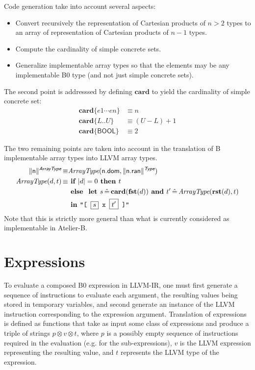 \documentclass{article}
\newcommand{\trad}[2]{\ensuremath{\lVert \textsf{#1} \rVert^{\textit{#2}}}}
\DeclareMathOperator{\isdef}{\equiv}
\newcommand{\llvm}[1]{\texttt{#1}}
\newcommand{\B}[1]{\textsf{#1}}
\newcommand{\IF}[0]{\textbf{ if }}
\newcommand{\ELSE}[0]{\textbf{ else }}
\newcommand{\THEN}[0]{\textbf{ then }}
\newcommand{\LET}[0]{\textbf{ let }}
\DeclareMathOperator{\BE}{\hat{=}}
\newcommand{\IN}[0]{\textbf{ in }}
\newcommand{\AND}[0]{\textbf{ and }}
\newcommand{\PH}[1]{\framebox{$#1$}}
\newcommand{\sep}[0]{\otimes}
\begin{document}
Code generation take into account several aspects:
\begin{itemize}
\item Convert recursively the representation of Cartesian products of
  $n>2$ types to an array of representation of Cartesian products of
  $n-1$ types.
\item Compute the cardinality of simple concrete sets.
\item Generalize implementable array types so that the elements may be
  any implementable B0 type (and not just simple concrete sets).
\end{itemize}

\newcommand{\card}[0]{\mathbf{card}}
\newcommand{\twodots}[0]{..}

The second point is addresssed by defining $\card$ to yield the
cardinality of simple concrete set:
\begin{align*}
  \card \{ e1 \cdots en \} &\isdef n \\
  \card \{ L \twodots U \} &\isdef (U - L) + 1 \\
  \card \{ \B{BOOL} \} &\isdef 2
\end{align*}

The two remaining points are taken into account in the translation of
B implementable array types into LLVM array types.
\begin{align*}
  \trad{n}{\B{ArrayType}} \isdef & \textit{ArrayType}(\B{n.dom}, \trad{n.ran}{\B{Type}}) \\
  \textit{ArrayType}(d, t) \isdef & \IF |d| = 0 \THEN t \\
  & \ELSE \LET s \BE \card(\fst(d)) \AND t' \BE \textit{ArrayType}(\rst(d), t) \\
  & \IN \llvm{"[ \PH{s} x \PH{t'} ]"}
\end{align*}
Note that this is strictly more general than what is currently
considered as implementable in Atelier-B.

\section{Expressions}
\label{sec:expr}

To evaluate a composed B0 expression in LLVM-IR, one must first
generate a sequence of instructions to evaluate each argument, the
resulting values being stored in temporary variables, and second
generate an instance of the LLVM instruction corresponding to the
expression argument.  Translation of expressions is defined as
functions that take as input some class of expressions and produce a
triple of strings $p \sep v \sep t$, where $p$ is a possibly empty
sequence of instructions required in the evaluation (e.g.  for the
sub-expressions), $v$ is the LLVM expression representing the
resulting value, and $t$ represents the LLVM type of the
expression. 
\end{document}
